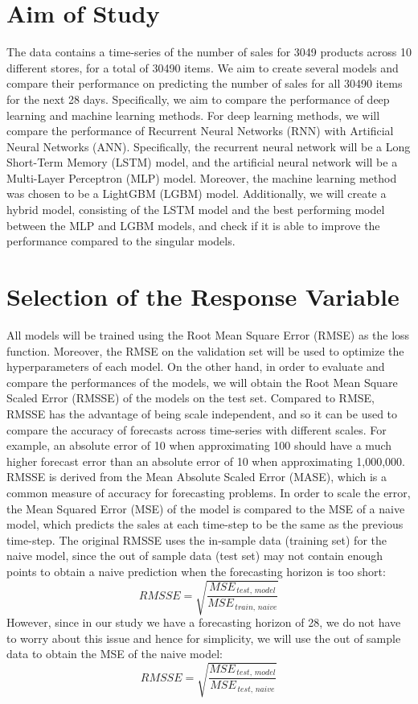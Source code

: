 \section{Aim of Study}
The data contains a time-series of the number of sales for 3049 products across 10 different stores, for a total of 30490 items. 
We aim to create several models and compare their performance on predicting the number of sales for all 30490 items for the next 28 days. 
Specifically, we aim to compare the performance of deep learning and machine learning methods.
For deep learning methods, we will compare the performance of Recurrent Neural Networks (RNN) with Artificial Neural Networks (ANN). 
Specifically, the recurrent neural network will be a Long Short-Term Memory (LSTM) model, and the artificial neural network will be a Multi-Layer Perceptron (MLP) model.
Moreover, the machine learning method was chosen to be a LightGBM (LGBM) model. 
Additionally, we will create a hybrid model, consisting of the LSTM model and the best performing model between the MLP and LGBM models, and check if it is able to improve the performance compared to the singular models.


\section{Selection of the Response Variable}
All models will be trained using the Root Mean Square Error (RMSE) as the loss function.
Moreover, the RMSE on the validation set will be used to optimize the hyperparameters of each model.
On the other hand, in order to evaluate and compare the performances of the models, we will obtain the Root Mean Square Scaled Error (RMSSE) of the models on the test set.
Compared to RMSE, RMSSE has the advantage of being scale independent, and so it can be used to compare the accuracy of forecasts across time-series with different scales.
For example, an absolute error of 10 when approximating 100 should have a much higher forecast error than an absolute error of 10 when approximating 1,000,000.
RMSSE is derived from the Mean Absolute Scaled Error (MASE), which is a common measure of accuracy for forecasting problems.
In order to scale the error, the Mean Squared Error (MSE) of the model is compared to the MSE of a naive model, which predicts the sales at each time-step to be the same as the previous time-step.
The original RMSSE uses the in-sample data (training set) for the naive model, since the out of sample data (test set) may not contain enough points to obtain a naive prediction when the forecasting horizon is too short: \cite{yardstick, m5}
\[RMSSE = \sqrt{\frac{MSE_{\,test, \,model}}{MSE_{\,train, \,naive}}}\]
However, since in our study we have a forecasting horizon of 28, we do not have to worry about this issue and hence for simplicity, we will use the out of sample data to obtain the MSE of the naive model:
\[RMSSE = \sqrt{\frac{MSE_{\,test, \,model}}{MSE_{\,test, \,naive}}}\]

